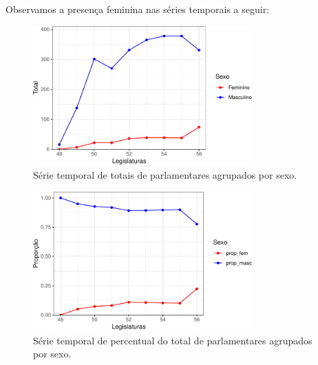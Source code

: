 \documentclass[
  letterpaper,
  DIV=11,
  numbers=noendperiod]{scrartcl}
\begin{document}
Observamos a presença feminina nas séries temporais a seguir:

\begin{figure}

{\centering \includegraphics[width=0.75\textwidth,height=\textheight]{caderno-isabela_files/figure-pdf/plot-totais-parlamentares-1.pdf}

}

\caption{Série temporal de totais de parlamentares agrupados por sexo.}

\end{figure}

\begin{figure}

{\centering \includegraphics[width=0.75\textwidth,height=\textheight]{caderno-isabela_files/figure-pdf/plot-percentuais-parlamentares-1.pdf}

}

\caption{Série temporal de percentual do total de parlamentares
agrupados por sexo.}

\end{figure}
\end{document}

